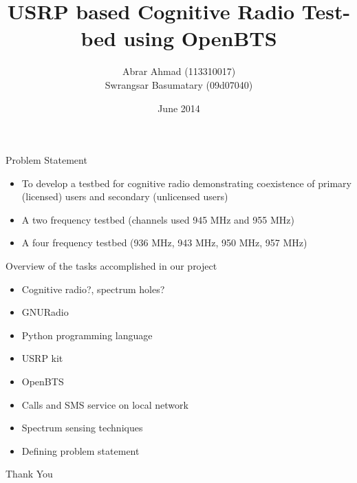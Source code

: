 \documentclass{beamer}
\title{USRP based Cognitive Radio Test-bed using OpenBTS}
\author{Abrar Ahmad (113310017) \\ Swrangsar Basumatary (09d07040) }
\institute{Department of Electrical Engineering \\ IIT Bombay, Powai}
\date{June 2014}
\begin{document}
    \frame{\titlepage}


	\begin{frame}{Problem Statement}
    	\begin{itemize}
    		\item To develop a testbed for cognitive radio demonstrating coexistence of primary (licensed) users and secondary (unlicensed users)
    		\item A two frequency testbed (channels used 945 MHz and 955 MHz)
    		\item A four frequency testbed (936 MHz, 943 MHz, 950 MHz, 957 MHz)
    	\end{itemize}
	\end{frame}
	
	\begin{frame}{Overview of the tasks accomplished in our project}
		\begin{itemize}
		\item Cognitive radio?,  spectrum holes?
		\item GNURadio
		\item Python programming language
		\item USRP kit
		\item OpenBTS
		\item Calls and SMS service on local network
		\item Spectrum sensing techniques
		\item Defining problem statement
		\end{itemize}
	\end{frame}
    
    
    \begin{frame}[c]
     \begin{center}
       \Huge Thank You
     \end{center}
    \end{frame}

    
\end{document}
